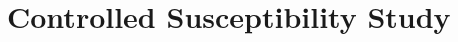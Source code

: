 \section{Controlled Susceptibility Study}
\label{app:controlled-susceptibility-study}

\begingroup
\graphicspath{{sections/state_matched_response_appendix_bundle/}}

\endgroup


